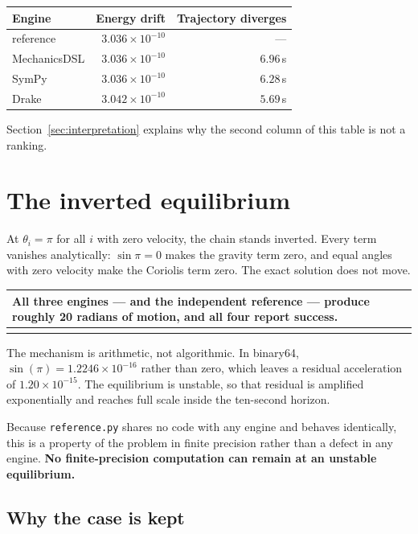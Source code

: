 \documentclass[11pt,a4paper]{article}
\makeatletter
\newenvironment{callout}
  {\par\medskip\noindent\begin{tabular}{@{}p{0.94\textwidth}@{}}
   \arrayrulecolor{warnrule}\hline\rule{0pt}{2.6ex}}
  {\\[0.8ex]\hline\arrayrulecolor{black}\end{tabular}\par\medskip}
\makeatother
\begin{document}
\begin{center}
\begin{tabular}{@{}lrr@{}}
\toprule
\textbf{Engine} & \textbf{Energy drift} & \textbf{Trajectory diverges} \\
\midrule
reference    & $3.036\times10^{-10}$ & --- \\
MechanicsDSL & $3.036\times10^{-10}$ & $6.96$\,s \\
SymPy        & $3.036\times10^{-10}$ & $6.28$\,s \\
Drake        & $3.042\times10^{-10}$ & $5.69$\,s \\
\bottomrule
\end{tabular}
\end{center}

\noindent Section~\ref{sec:interpretation} explains why the second column of
this table is not a ranking.

\section{The inverted equilibrium}\label{sec:equilibrium}

At $\theta_i = \pi$ for all $i$ with zero velocity, the chain stands inverted.
Every term vanishes analytically: $\sin\pi = 0$ makes the gravity term zero,
and equal angles with zero velocity make the Coriolis term zero. The exact
solution does not move.

\begin{callout}
\textbf{All three engines --- and the independent reference --- produce roughly
20 radians of motion, and all four report success.}
\end{callout}

\noindent The mechanism is arithmetic, not algorithmic. In binary64,
$\sin(\pi) = 1.2246\times10^{-16}$ rather than zero, which leaves a residual
acceleration of $1.20\times10^{-15}$. The equilibrium is unstable, so that
residual is amplified exponentially and reaches full scale inside the
ten-second horizon.

Because \texttt{reference.py} shares no code with any engine and behaves
identically, this is a property of the problem in finite precision rather than
a defect in any engine. \textbf{No finite-precision computation can remain at an
unstable equilibrium.}

\subsection{Why the case is kept}
\end{document}
